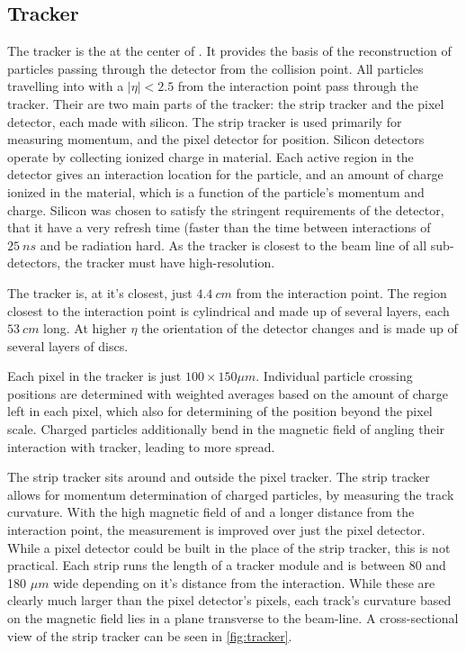 \subsection{Tracker}
The tracker is the at the center of \CMS.  It provides the basis of the reconstruction of particles passing through the detector from the collision point.  All particles travelling into \CMS with a \ensuremath{|\eta| < 2.5} from the interaction point pass through the tracker.  Their are two main parts of the tracker: the strip tracker and the pixel detector, each made with silicon.  The strip tracker is used primarily for measuring momentum, and the pixel detector for position.
Silicon detectors operate by collecting ionized charge in material.  Each active region in the detector gives an interaction location for the particle, and an amount of charge ionized in the material, which is a function of the particle's momentum and charge.  Silicon was chosen to satisfy the stringent requirements of the detector, that it have a very refresh time (faster than the time between interactions of \ensuremath{\SI{25}{ns}} and be radiation hard.  As the tracker is closest to the beam line of all sub-detectors, the tracker must have high-resolution.

The tracker is, at it's closest, just \ensuremath{\SI{4.4}{cm}} from the interaction point.  The region closest to the interaction point is cylindrical and made up of several layers, each \ensuremath{\SI{53}{cm}} long.  At higher \ensuremath{\eta} the orientation of the detector changes and is made up of several layers of discs.

Each pixel in the tracker is just \ensuremath{100\times150 \mu m}.  Individual particle crossing positions are determined with weighted averages based on the amount of charge left in each pixel, which also for determining of the position beyond the pixel scale.  Charged particles additionally bend in the magnetic field of \CMS angling their interaction with tracker, leading to more spread.

The strip tracker sits around and outside the pixel tracker.  The strip tracker allows for momentum determination of charged particles, by measuring the track curvature.  With the high magnetic field of \CMS and a longer distance from the interaction point, the measurement is improved over just the pixel detector.  While a pixel detector could be built in the place of the strip tracker, this is not practical.  Each strip runs the length of a tracker module and is between 80 and 180 \ensuremath{\mu m} wide depending on it's distance from the interaction.  While these are clearly much larger than the pixel detector's pixels, each track's curvature based on the magnetic field lies in a plane transverse to the beam-line.  A cross-sectional view of the strip tracker can be seen in \ref{fig:tracker}.

